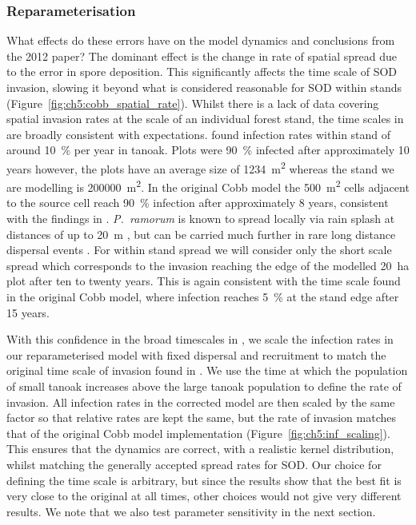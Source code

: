 \subsubsection{Reparameterisation}\label{sec:ch5:reparameterisation}

What effects do these errors have on the model dynamics and conclusions from the 2012 paper? The dominant effect is the change in rate of spatial spread due to the error in spore deposition. This significantly affects the time scale of SOD invasion, slowing it beyond what is considered reasonable for SOD within stands (Figure~\ref{fig:ch5:cobb_spatial_rate}). Whilst there is a lack of data covering spatial invasion rates at the scale of an individual forest stand, the time scales in \citet{cobb_ecosystem_2012} are broadly consistent with expectations. \citet{mcpherson_responses_2010} found infection rates within stand of around \SI{10}{\percent} per year in tanoak. Plots were \SI{90}{\percent} infected after approximately 10 years however, the plots have an average size of \SI{1234}{\meter\squared} whereas the stand we are modelling is \SI{200000}{\meter\squared}. In the original Cobb model the \SI{500}{\meter\squared} cells adjacent to the source cell reach \SI{90}{\percent} infection after approximately 8 years, consistent with the findings in \citet{mcpherson_responses_2010}. \textit{P.~ramorum} is known to spread locally via rain splash at distances of up to \SI{20}{\meter} \citep{davidson_transmission_2005}, but can be carried much further in rare long distance dispersal events \citep{meentemeyer_epidemiological_2011}. For within stand spread we will consider only the short scale spread which corresponds to the invasion reaching the edge of the modelled \SI{20}{\hectare} plot after ten to twenty years. This is again consistent with the time scale found in the original Cobb model, where infection reaches \SI{5}{\percent} at the stand edge after 15 years.

With this confidence in the broad timescales in \citet{cobb_ecosystem_2012}, we scale the infection rates in our reparameterised model with fixed dispersal and recruitment to match the original time scale of invasion found in \citet{cobb_ecosystem_2012}. We use the time at which the population of small tanoak increases above the large tanoak population to define the rate of invasion. All infection rates in the corrected model are then scaled by the same factor so that relative rates are kept the same, but the rate of invasion matches that of the original Cobb model implementation (Figure~\ref{fig:ch5:inf_scaling}). This ensures that the dynamics are correct, with a realistic kernel distribution, whilst matching the generally accepted spread rates for SOD\@. Our choice for defining the time scale is arbitrary, but since the results show that the best fit is very close to the original at all times, other choices would not give very different results. We note that we also test parameter sensitivity in the next section.

